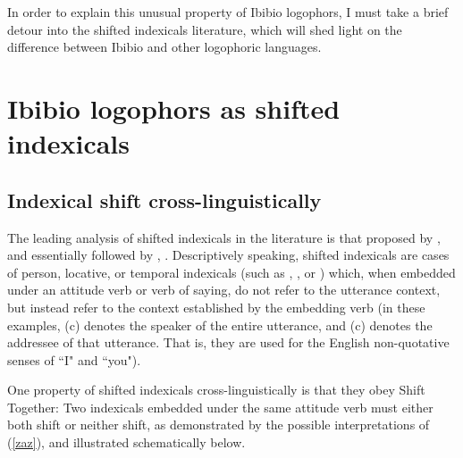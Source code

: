 \documentclass[output=paper]{langscibook}
\begin{document}
In order to explain this unusual property of Ibibio logophors, I must take a brief detour into the shifted indexicals literature, which will shed light on the difference between Ibibio and other logophoric languages.



\section{Ibibio logophors as shifted indexicals}


\subsection{Indexical shift cross-linguistically}

The leading analysis of shifted indexicals in the literature is that proposed by \citet{Anand2006}, and essentially followed by \citet{Sudo2012,Shklovsky2014,Deal2017}, . Descriptively speaking, shifted indexicals are cases of person, locative, or temporal indexicals (such as , , or ) which, when embedded under an attitude verb or verb of saying, do not refer to the utterance context, but instead refer to the context established by the embedding verb (in these examples, (c) denotes the speaker of the entire utterance, and (c) denotes the addressee of that utterance. That is, they are used for the English non-quotative senses of ``I" and ``you").
\begin{exe}
	\label{zaz}
\end{exe}
One property of shifted indexicals cross-linguistically is that they obey Shift Together: Two indexicals embedded under the same attitude verb must either both shift or neither shift, as demonstrated by the possible interpretations of (\ref{zaz}), and illustrated schematically below.
\end{document}
